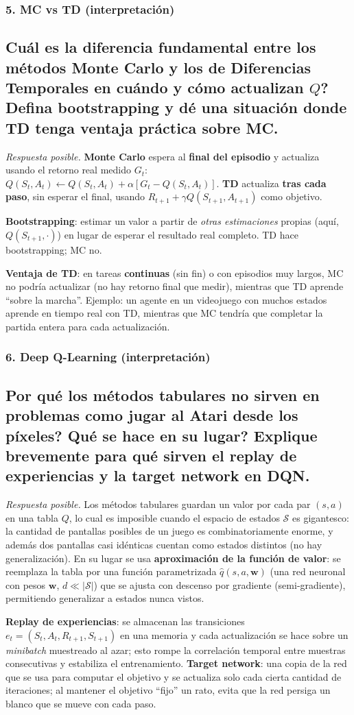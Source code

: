 \documentclass[11pt, a4paper]{article}
\newcommand{\pregunta}[1]{\subsection{#1}}
\newcommand{\eje}[1]{\subsubsection{#1}}
\begin{document}
\eje{5. MC vs TD (interpretaci\'on)}
\pregunta{\textquestiondown Cu\'al es la diferencia fundamental entre los m\'etodos Monte Carlo y los de Diferencias Temporales en cu\'ando y c\'omo actualizan $Q$? Defina \textbf{bootstrapping} y d\'e una situaci\'on donde TD tenga ventaja pr\'actica sobre MC.}

\begin{respuesta}
\textit{Respuesta posible.} \textbf{Monte Carlo} espera al \textbf{final del episodio} y actualiza usando el retorno real medido $G_t$: $Q(S_t,A_t)\leftarrow Q(S_t,A_t)+\alpha[G_t - Q(S_t,A_t)]$. \textbf{TD} actualiza \textbf{tras cada paso}, sin esperar el final, usando $R_{t+1}+\gamma Q(S_{t+1},A_{t+1})$ como objetivo.

\textbf{Bootstrapping}: estimar un valor a partir de \emph{otras estimaciones} propias (aqu\'i, $Q(S_{t+1},\cdot)$) en lugar de esperar el resultado real completo. TD hace bootstrapping; MC no.

\textbf{Ventaja de TD}: en tareas \textbf{continuas} (sin fin) o con episodios muy largos, MC no podr\'ia actualizar (no hay retorno final que medir), mientras que TD aprende ``sobre la marcha''. Ejemplo: un agente en un videojuego con muchos estados aprende en tiempo real con TD, mientras que MC tendr\'ia que completar la partida entera para cada actualizaci\'on.
\end{respuesta}

\eje{6. Deep Q-Learning (interpretaci\'on)}
\pregunta{\textquestiondown Por qu\'e los m\'etodos tabulares no sirven en problemas como jugar al Atari desde los p\'ixeles? \textquestiondown Qu\'e se hace en su lugar? Explique brevemente para qu\'e sirven el \textbf{replay de experiencias} y la \textbf{target network} en DQN.}

\begin{respuesta}
\textit{Respuesta posible.} Los m\'etodos tabulares guardan un valor por cada par $(s,a)$ en una tabla $Q$, lo cual es imposible cuando el espacio de estados $\mathcal{S}$ es gigantesco: la cantidad de pantallas posibles de un juego es combinatoriamente enorme, y adem\'as dos pantallas casi id\'enticas cuentan como estados distintos (no hay generalizaci\'on). En su lugar se usa \textbf{aproximaci\'on de la funci\'on de valor}: se reemplaza la tabla por una funci\'on parametrizada $\hat q(s,a,\mathbf{w})$ (una red neuronal con pesos $\mathbf{w}$, $d \ll |\mathcal{S}|$) que se ajusta con descenso por gradiente (semi-gradiente), permitiendo generalizar a estados nunca vistos.

\textbf{Replay de experiencias}: se almacenan las transiciones $e_t=(S_t,A_t,R_{t+1},S_{t+1})$ en una memoria y cada actualizaci\'on se hace sobre un \emph{minibatch} muestreado al azar; esto rompe la correlaci\'on temporal entre muestras consecutivas y estabiliza el entrenamiento. \textbf{Target network}: una copia de la red que se usa para computar el objetivo y se actualiza solo cada cierta cantidad de iteraciones; al mantener el objetivo ``fijo'' un rato, evita que la red persiga un blanco que se mueve con cada paso.
\end{respuesta}
\end{document}
